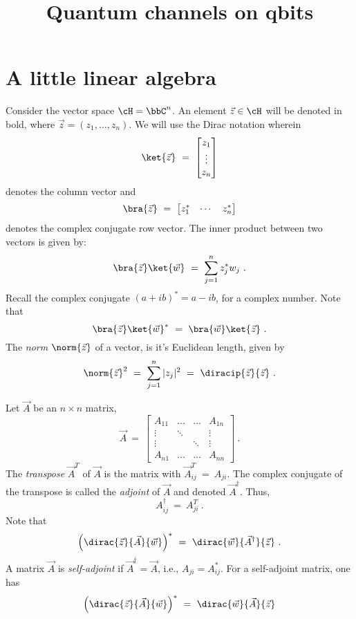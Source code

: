 \documentclass[12pt]{amsart}
\numberwithin{equation}{section}
\numberwithin{figure}{section}
\theoremstyle{theorem}
\begin{document}
	\title{Quantum channels on qbits}
	\maketitle
	\section{A little linear algebra}
	Consider the vector space $\cH = \bbC^n$.  An 
	element $\vec{z}\in \cH$ will be denoted in bold, where 
	$\vec{z}=(z_1,\ldots,z_n)$.  We will use the Dirac notation wherein
	$$\ket{\vec{z}} \ = \ \begin{bmatrix} z_1 \\ \vdots \\ z_n \end{bmatrix}$$
	denotes the column vector and  $$\bra{\vec{z}} \ = \ \begin{bmatrix} z_1^* 
		& \cdots & z_n^*  \end{bmatrix} $$
	denotes the complex conjugate row vector.  The inner product between two 
	vectors is given by:
	$$\bra{\vec{z}}\ket{\vec{w}} \ = \ \sum_{j=1}^n z_j^* w_j \ . $$
	Recall the complex conjugate $(a+ib)^* = a - i b$, for a complex number.  
	Note that
	$$\bra{\vec{z}}\ket{\vec{w}}^* \ = \ \bra{\vec{w}}\ket{\vec{z}} \ . $$
	The \emph{norm} $\norm{\vec{z}}$ of a vector, is it's Euclidean length, 
	given by
	$$\norm{\vec{z}}^2 \ = \ \sum_{j=1}^n |z_j|^2 \ = \ 
	\diracip{\vec{z}}{\vec{z}} \ . $$
	
		Let $\vec{A}$ be an $n\times n$ matrix,  
	$$ \vec{A} \ = \ \begin{bmatrix}
		A_{11} & \ldots & \ldots & A_{1n} \\
		\vdots & \ddots & & \vdots \\
		\vdots & & \ddots & \vdots \\
		A_{n1} & \ldots & \ldots & A_{nn}
	\end{bmatrix} \ . $$
	The \emph{transpose} $\vec{A}^T$ of $\vec{A}$ is the matrix with 
	$\vec{A}^T_{ij}\ = \ A_{ji}$.  The complex conjugate of the transpose is 
	called the \emph{adjoint} of $\vec{A}$ and denoted $\vec{A}^\dagger$.  
	Thus, 
	$$A_{ij}^\dagger \ = \ A_{ji}^T \ . $$
	Note that 
	$$\left ( \dirac{\vec{z}}{\vec{A}}{\vec{w}} \right )^* \ = \ 
	\dirac{\vec{w}}{\vec{A}^\dagger}{\vec{z}} \ . $$
	A matrix $\vec{A}$ is \emph{self-adjoint} if  $\vec{A}^\dagger = \vec{A}$, 
	i.e., $A_{ji} = A_{ij}^*$.  For a self-adjoint matrix, one has
	\begin{equation}\label{eq:selfadjointconjugateip}
		\left ( \dirac{\vec{z}}{\vec{A}}{\vec{w}} \right )^* \ = \ 
		\dirac{\vec{w}}{\vec{A}}{\vec{z}} 
	\end{equation}
	
\end{document}

